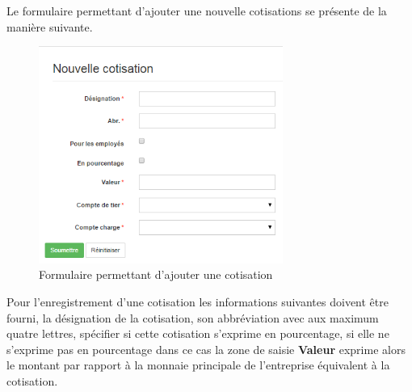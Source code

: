 \documentclass[12pt,a4paper]{report}
\begin{document}
Le formulaire permettant d'ajouter une nouvelle cotisations se présente de la manière suivante. 

\begin{figure}[h]
\begin{center}
\includegraphics[width=8cm]{pic/NewCotisationForm.png}
\end{center}
\caption{Formulaire permettant d'ajouter une cotisation}
\label{Formulaire permettant d'ajouter une cotisation}
\end{figure} 

Pour l'enregistrement d'une cotisation les informations suivantes doivent être fourni, la désignation de la cotisation, son abbréviation avec aux maximum quatre lettres, spécifier si cette cotisation s'exprime en pourcentage, si elle ne s'exprime pas en pourcentage dans ce cas la zone de saisie \textbf{Valeur} exprime alors le montant par rapport à la monnaie principale de l'entreprise équivalent à la cotisation. 
\end{document}
